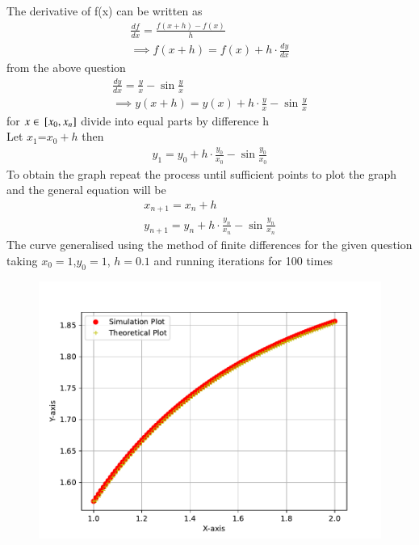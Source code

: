 \documentclass[journal]{IEEEtran}
\begin{document}
The derivative of f(x) can be written as 
\begin{align}
    \frac{df}{dx}=\frac{f(x+h)-f(x)}{h}\\
    \implies f(x+h)=f(x)+h\cdot\frac{dy}{dx}
\end{align}
from the above question 
\begin{align}
    \frac{dy}{dx}=\frac{y}{x}-\sin{\frac{y}{x}}\\
    \implies y(x+h)=y(x)+h\cdot \frac{y}{x}-\sin{\frac{y}{x}}
\end{align}
for $x \in {}\left[x_{0},x_{n}\right]$ divide into equal parts by difference h\\
Let $x_{1}$=$x_{0}+h$ then 
\begin{align}
    y_{1}=y_{0}+h\cdot \frac{y_{0}}{x_{0}}-\sin{\frac{y_{0}}{x_{0}}}
\end{align}
 To obtain the graph repeat the process until sufficient points to plot the graph and the general equation will be 
\begin{align}
    x_{n+1}=x_{n}+h\\
    y_{n+1}=y_{n}+h\cdot \frac{y_{n}}{x_{n}}-\sin{\frac{y_{n}}{x_{n}}}
\end{align}
The curve generalised using the method of finite differences for the given question taking $x_{0}=1$,$y_{0}=1$, $h=0.1$ and running iterations for 100 times
\begin{figure}[h!]
   \centering
   \includegraphics[width=0.7\columnwidth]{figs/fig.pdf}
\end{figure}
\end{document}
